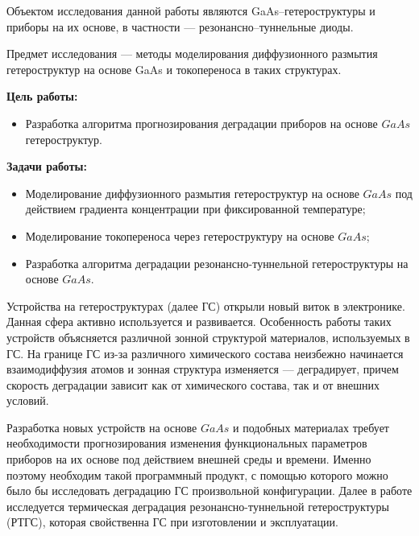 \Introduction
Объектом исследования данной работы являются GaAs--гетероструктуры и приборы на их основе, в частности --- резонансно--туннельные диоды. 

Предмет исследования --- методы моделирования диффузионного размытия гетероструктур на основе GaAs и токопереноса в таких структурах.

\textbf{Цель работы:}
\begin{itemize}
	\item Разработка алгоритма прогнозирования деградации приборов на основе $GaAs$ гетероструктур.
\end{itemize}

\textbf{Задачи работы:}
\begin{itemize}
	\item Моделирование диффузионного размытия гетероструктур на основе $GaAs$ под действием градиента концентрации при фиксированной температуре;
	\item Моделирование токопереноса через гетероструктуру на основе $GaAs$;
	\item Разработка алгоритма деградации резонансно-туннельной гетероструктуры на основе $GaAs$.
\end{itemize}

Устройства на гетероструктурах (далее ГС) открыли новый виток в электронике. Данная сфера активно используется и развивается. Особенность работы таких устройств объясняется различной зонной структурой материалов, используемых в ГС. На границе ГС из-за различного химического состава неизбежно начинается взаимодиффузия атомов и зонная структура изменяется --- деградирует, причем скорость деградации зависит как от химического состава, так и от внешних условий. 

Разработка новых устройств на основе $GaAs$ и подобных  материалах требует необходимости прогнозирования изменения функциональных параметров приборов на их основе под действием внешней среды и времени. Именно поэтому необходим такой программный продукт, с помощью которого можно было бы исследовать деградацию ГС произвольной конфигурации. Далее в работе исследуется термическая деградация резонансно-туннельной гетероструктуры (РТГС), которая свойственна ГС при изготовлении и эксплуатации.

